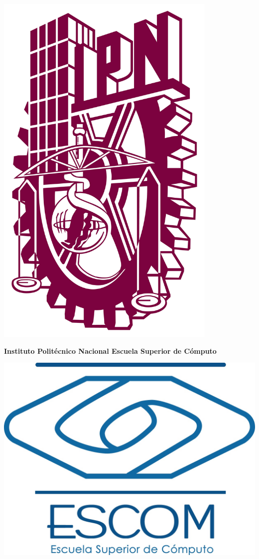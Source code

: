 \begin{titlepage}
    \begin{minipage}{0.15\textwidth}
    	\includegraphics[width=0.8\textwidth]{Portada/img/ipn.jpg}
    \end{minipage}
    \begin{minipage}{0.65\textwidth}
        \begin{center}
            \large \bf Instituto Politécnico Nacional \newline
            \large \bf Escuela Superior de Cómputo \newline
        \end{center}
    \end{minipage}
    \begin{minipage}{0.20\textwidth}
        \includegraphics[width=.9\textwidth]{Portada/img/escom.jpg}

\end{minipage}
\end{titlepage}
